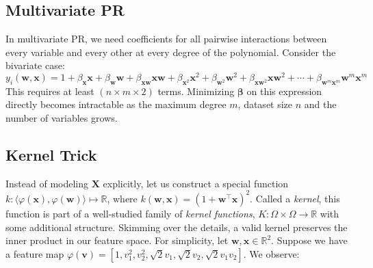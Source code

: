 \subsection{Multivariate PR}

In multivariate PR, we need coefficients for all pairwise interactions between every variable and every other at every degree of the polynomial. Consider the bivariate case:
%
\begin{equation}
    y_i(\mathbf w, \mathbf x) = 1 + \beta_{\mathbf x} \mathbf x + \beta_{\mathbf w}\mathbf w + \beta_{\mathbf x\mathbf w} \mathbf x\mathbf w + \beta_{\mathbf x^2} \mathbf x^2 + \beta_{\mathbf w^2} \mathbf w^2 + \beta_{\mathbf x\mathbf w^2} \mathbf x\mathbf w^2 + \cdots + \beta_{\mathbf w^m\mathbf x^m} \mathbf w^m\mathbf x^m
\end{equation}
%
This requires at least $(n \times m \times 2)$ terms. Minimizing $\bm\beta$ on this expression directly becomes intractable as the maximum degree $m$, dataset size $n$ and the number of variables grows.

\subsection{Kernel Trick}

Instead of modeling $\mathbf X$ explicitly, let us construct a special function $k: \langle\varphi(\mathbf x), \varphi(\mathbf w)\rangle \mapsto \mathbb R$, where $k(\mathbf w, \mathbf x) = (1 + \mathbf w^\intercal \mathbf x)^2$. Called a \textit{kernel}, this function is part of a well-studied family of \textit{kernel functions}, $K: \Omega \times \Omega \rightarrow \mathbb R$ with some additional structure. Skimming over the details, a valid kernel preserves the inner product in our feature space. For simplicity, let $\mathbf w, \mathbf x \in \mathbb R^2$. Suppose we have a feature map $\varphi(\mathbf v) = \left[1, v_1^2, v_2^2, \sqrt{2} v_1, \sqrt{2} v_2, \sqrt{2} v_1 v_2\right]$. We observe:

